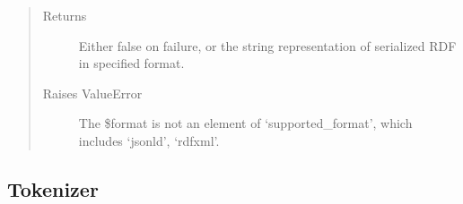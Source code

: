\documentclass[letterpaper,10pt,english]{sphinxmanual}
\begin{document}
\begin{fulllineitems}
\begin{fulllineitems}
\begin{quote}
\begin{description}
\begin{itemize}
\end{itemize}

\item[{Returns}] \leavevmode
Either false on failure, or the string representation of serialized RDF in specified format.

\item[{Raises ValueError}] \leavevmode
The \$format is not an element of `supported\_format', which includes `jsonld', `rdfxml'.

\end{description}\end{quote}

\end{fulllineitems}


\end{fulllineitems}



\subsection{Tokenizer}
\label{docs/api:tokenizer}
\end{document}
